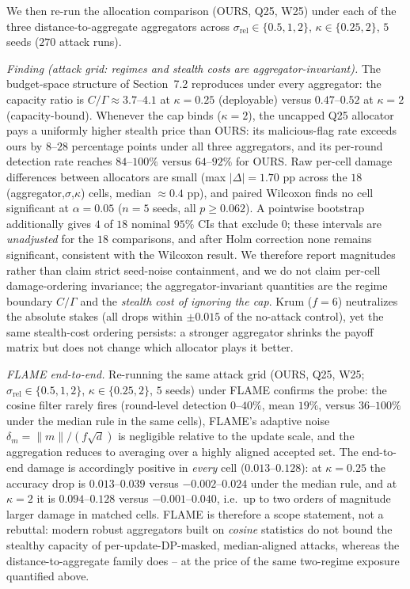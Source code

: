 \documentclass[final,1p,times]{elsarticle}
\begin{document}
We then re-run the allocation comparison (OURS, Q25, W25) under each
of the three distance-to-aggregate aggregators across
$\sigma_{\mathrm{rel}}\in\{0.5,1,2\}$,
$\kappa\in\{0.25,2\}$, $5$ seeds ($270$ attack runs).

\emph{Finding (attack grid: regimes and stealth costs are
aggregator-invariant).} The budget-space structure of
Section~7.2 reproduces under every aggregator: the capacity ratio
is $C/\Gamma\approx3.7$--$4.1$ at $\kappa{=}0.25$ (deployable) versus
$0.47$--$0.52$ at $\kappa{=}2$ (capacity-bound). Whenever the cap
binds ($\kappa{=}2$), the uncapped Q25 allocator pays a uniformly
higher stealth price than OURS: its malicious-flag rate exceeds ours by
$8$--$28$ percentage points under all three aggregators, and its
per-round detection rate reaches $84$--$100\%$ versus $64$--$92\%$ for
OURS. Raw per-cell damage differences between allocators are small (max
$|\Delta|=1.70$ pp across the $18$ (aggregator,$\sigma$,$\kappa$) cells, median
$\approx 0.4$ pp), and paired Wilcoxon finds no cell significant at
$\alpha{=}0.05$ ($n{=}5$ seeds, all $p{\ge}0.062$). A pointwise bootstrap
additionally gives $4$ of $18$ nominal $95\%$ CIs that exclude $0$; these
intervals are \emph{unadjusted} for the $18$ comparisons, and after Holm
correction none remains significant, consistent with the Wilcoxon result. We
therefore report magnitudes rather than claim strict
seed-noise containment, and we do not claim per-cell damage-ordering invariance;
the aggregator-invariant
quantities are the regime boundary $C/\Gamma$ and the \emph{stealth
cost of ignoring the cap}. Krum ($f{=}6$) neutralizes the absolute
stakes (all drops within $\pm0.015$ of the no-attack control), yet the
same stealth-cost ordering persists: a stronger aggregator shrinks the
payoff matrix but does not change which allocator plays it better.

\emph{FLAME end-to-end.}
Re-running the same attack grid (OURS, Q25, W25;
$\sigma_{\mathrm{rel}}\in\{0.5,1,2\}$, $\kappa\in\{0.25,2\}$, $5$ seeds)
under FLAME confirms the probe: the cosine filter rarely fires
(round-level detection $0$--$40\%$, mean $19\%$, versus $36$--$100\%$
under the median rule in the same cells), FLAME's adaptive noise
$\delta_m=\lVert m\rVert/(f\sqrt d)$ is negligible relative to the
update scale, and the aggregation reduces to averaging over a highly
aligned accepted set. The end-to-end damage is accordingly positive in
\emph{every} cell ($0.013$--$0.128$): at $\kappa{=}0.25$ the accuracy
drop is $0.013$--$0.039$ versus $-0.002$--$0.024$ under the median
rule, and at $\kappa{=}2$ it is $0.094$--$0.128$ versus
$-0.001$--$0.040$, i.e.\ up to two orders of magnitude larger
damage in matched cells. FLAME is therefore a scope statement, not a rebuttal:
modern robust aggregators built on \emph{cosine} statistics do not
bound the stealthy capacity of per-update-DP-masked, median-aligned
attacks, whereas the distance-to-aggregate family does -- at the price
of the same two-regime exposure quantified above.
\end{document}
